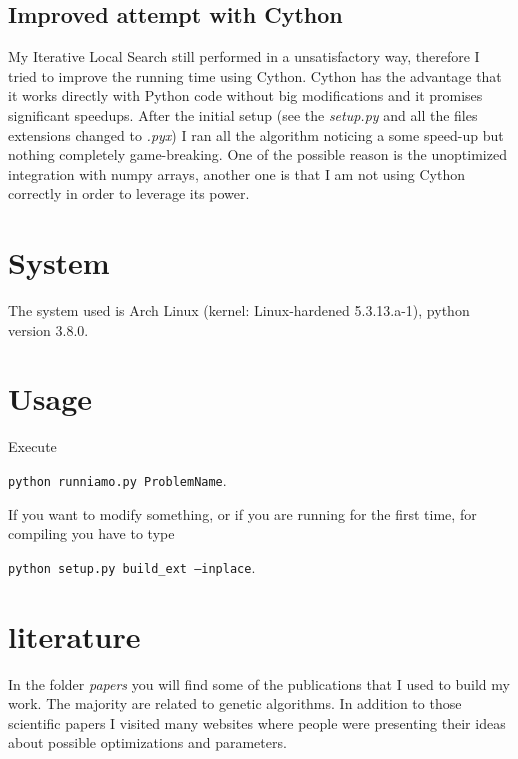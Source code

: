 \documentclass[paper=a4, fontsize=11pt]{scrartcl} %
\numberwithin{equation}{section} %
\numberwithin{figure}{section} %
\numberwithin{table}{section} %
\begin{document}
\subsection{Improved attempt with Cython}

My Iterative Local Search still performed in a unsatisfactory way, therefore I
tried to improve the running time using Cython.
Cython has the advantage that it works directly with Python code without big
modifications and it promises significant speedups.
After the initial setup (see the \emph{setup.py} and all the files extensions
changed to \emph{.pyx}) I ran all the algorithm noticing a some speed-up but
nothing completely game-breaking.
One of the possible reason is the unoptimized integration with numpy arrays,
another one is that I am not using Cython correctly in order to leverage its
power.


\section{System}

The system used is Arch Linux (kernel: Linux-hardened 5.3.13.a-1), python version 3.8.0.

\section{Usage}

Execute 

\texttt{python runniamo.py ProblemName}.

If you want to modify something, or if you are running for the first time, for
compiling you have to type 

\texttt{python setup.py build\_ext --inplace}.


\section{literature}

In the folder \emph{papers} you will find some of the publications that I used
to build my work.
The majority are related to genetic algorithms.
In addition to those scientific papers I visited many websites where people
were presenting their ideas about possible optimizations and parameters.

\printbibliography
\end{document}
